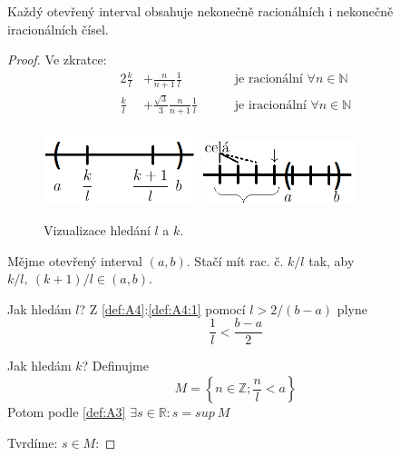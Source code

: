 \begin{theorem}
Každý otevřený interval obsahuje nekonečně racionálních i nekonečně iracionálních čísel.
\end{theorem}
\begin{proof}
	Ve zkratce:
	\begin{alignat}{2}
		\frac{k}{l}&+\frac{n}{n+1}\frac{1}{l} &&\quad\text{ je racionální }\forall n\in\mathbb{N} \\
		\frac{k}{l}&+\frac{\sqrt{3}}{3}\frac{n}{n+1}\frac{1}{l} &&\quad\text{ je iracionální }\forall n\in\mathbb{N}
	\end{alignat}
	\begin{figure}[ht!]
		\begin{center}
			\includegraphics[width=0.4\textwidth,keepaspectratio]{../img/chapter1/interval.png}
			\includegraphics[width=0.4\textwidth,keepaspectratio]{../img/chapter1/interval2.png}
			\caption{Vizualizace hledání $l$ a $k$.}
		\end{center}
	\end{figure}\FloatBarrier
	
	Mějme otevřený interval $(a,b)$. Stačí mít rac. č. $k/l$ tak, aby \\$k/l,~(k+1)/l\in(a,b)$.
	
	Jak hledám $l$? Z \autoref*{def:A4}:\autoref{def:A4:1} pomocí $l>2/(b-a)$ plyne
	\begin{equation}
		\frac{1}{l}<\frac{b-a}{2}
	\end{equation}
	
	Jak hledám $k$? Definujme
	\begin{equation}
		M=\left\{n\in\mathbb{Z};\frac{n}{l}<a\right\}
	\end{equation}
	Potom podle \autoref{def:A3} $\exists s\in\mathbb{R}:s=sup~M$

	Tvrdíme: $s\in M$:


\end{proof}
